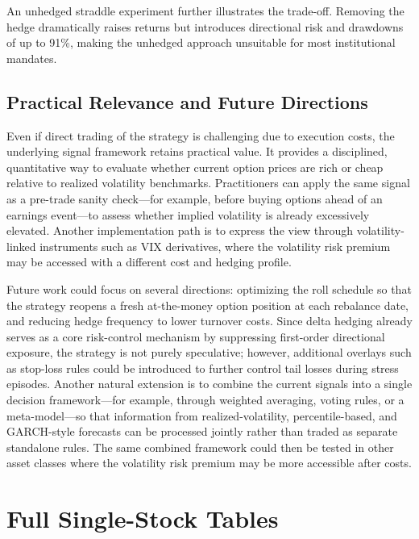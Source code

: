 ﻿\documentclass{article}
\begin{document}
An unhedged straddle experiment further illustrates the trade-off. Removing the hedge dramatically raises returns but introduces directional risk and drawdowns of up to 91\%, making the unhedged approach unsuitable for most institutional mandates.

\subsection{Practical Relevance and Future Directions}
Even if direct trading of the strategy is challenging due to execution costs, the underlying signal framework retains practical value. It provides a disciplined, quantitative way to evaluate whether current option prices are rich or cheap relative to realized volatility benchmarks. Practitioners can apply the same signal as a pre-trade sanity check—for example, before buying options ahead of an earnings event—to assess whether implied volatility is already excessively elevated. Another implementation path is to express the view through volatility-linked instruments such as VIX derivatives, where the volatility risk premium may be accessed with a different cost and hedging profile.

Future work could focus on several directions: optimizing the roll schedule so that the strategy reopens a fresh at-the-money option position at each rebalance date, and reducing hedge frequency to lower turnover costs. Since delta hedging already serves as a core risk-control mechanism by suppressing first-order directional exposure, the strategy is not purely speculative; however, additional overlays such as stop-loss rules could be introduced to further control tail losses during stress episodes. Another natural extension is to combine the current signals into a single decision framework---for example, through weighted averaging, voting rules, or a meta-model---so that information from realized-volatility, percentile-based, and GARCH-style forecasts can be processed jointly rather than traded as separate standalone rules. The same combined framework could then be tested in other asset classes where the volatility risk premium may be more accessible after costs.

\small





\clearpage
\appendix
{}

\section{Full Single-Stock Tables}
\label{app:single-stock-full-tables}
\end{document}
